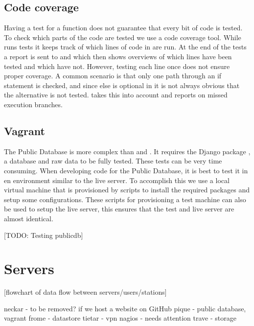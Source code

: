 \subsection{Code coverage}

Having a test for a function does not guarantee that every bit of code is tested. To check which parts of the code are tested we use a code coverage tool. While \travis runs tests it keeps track of which lines of code in \sapphire are run. At the end of the tests a report is sent to \coveralls \cite{coveralls} and \codecov \cite{codecov} which then shows overviews of which lines have been tested and which have not. However, testing each line once does not ensure proper coverage. A common scenario is that only one path through an if statement is checked, and since else is optional in \python it is not always obvious that the alternative is not tested. \codecov takes this into account and reports on missed execution branches.


\subsection{Vagrant}

The Public Database is more complex than \sapphire and \jsparc. It requires the Django package \cite{django}, a database and raw data to be fully tested. These tests can be very time consuming. When developing code for the Public Database, it is best to test it in en environment similar to the live server. To accomplish this we use a local virtual machine that is provisioned by scripts to install the required packages and setup some configurations. These scripts for provisioning a test machine can also be used to setup the live server, this ensures that the test and live server are almost identical.

[TODO: Testing publicdb]


\section{Servers}


[flowchart of data flow between servers/users/stations]

neckar - to be removed? if we host a website on GitHub
pique - public database, vagrant
frome - datastore
tietar - vpn nagios - needs attention
trave - storage
